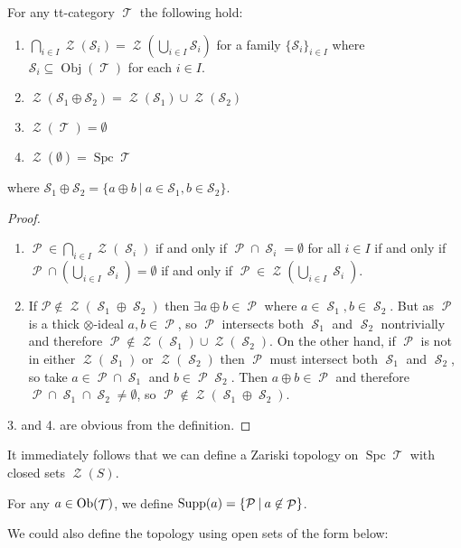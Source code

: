 \documentclass[11pt]{article}
\DeclareMathOperator{\CS}{\mathcal{S}}
\DeclareMathOperator{\cS}{\mathcal{S}}
\DeclareMathOperator{\cZ}{\mathcal{Z}}
\DeclareMathOperator{\ob}{Obj}
\DeclareMathOperator{\TT}{\mathcal{T}}
\DeclareMathOperator{\cP}{\mathcal{P}}
\DeclareMathOperator{\spc}{Spc}
\begin{document}
\begin{prop}
For any tt-category $\TT$ the following hold:
\begin{enumerate}[1.]
	\item $\bigcap_{i \in I}\cZ(\mathcal{S}_i) = \cZ(\bigcup_{i \in I}\mathcal{S}_i)$ for a family $\{\mathcal{S}_i\}_{i \in I}$ where $\mathcal{S}_i \subseteq \ob(\TT)$ for each $i \in I$.
	\item $\cZ(\mathcal{S}_1 \oplus \mathcal{S}_2) = \cZ(\mathcal{S}_1) \cup \cZ(\mathcal{S}_2)$ 
	\item $\cZ(\TT) = \emptyset$
	\item $\cZ(\emptyset) = \spc \TT$
\end{enumerate}
where $\mathcal{S}_1 \oplus \mathcal{S}_2 = \{a \oplus b\:|\: a \in \mathcal{S}_1, b \in \mathcal{S}_2\}$.
\end{prop}
\begin{proof}
\

\begin{enumerate}[1.]
	\item  $\cP \in \bigcap_{i \in I}\cZ(\cS_i)$ if and only if $\cP \cap \cS_i = \emptyset$ for all $i \in I$ if and only if $\cP \cap \left(\bigcup_{i \in I}\cS_i \right) = \emptyset $ if and only if $\cP \in \cZ(\bigcup_{i \in I}\cS_i)$.
	\item If $\mathcal{P} \not\in \cZ(\CS_1 \oplus \CS_2)$ then $\exists a \oplus b \in \cP$ where $a \in \CS_1,b \in \CS_2$. But as $\cP$ is a thick $\otimes$-ideal $a,b \in \cP$, so $\cP$ intersects both $\CS_1$ and $\CS_2$ nontrivially and therefore $\cP \not\in \cZ(\CS_1) \cup \cZ(\CS_2)$. On the other hand, if $\cP$ is not in either $\cZ(\CS_1)$ or $\cZ(\CS_2)$ then $\cP$ must intersect both $\CS_1$ and $\CS_2$, so take $a \in \cP \cap \CS_1$ and $b \in \cP \CS_2$. Then $a \oplus b \in \cP$ and therefore $\cP \cap \CS_1 \cap \CS_2 \not = \emptyset$, so $\cP \not\in \cZ(\CS_1 \oplus \CS_2)$.
\end{enumerate}
3. and 4. are obvious from the definition.
\end{proof}

It immediately follows that we can define a Zariski topology on $\spc \TT$ with closed sets $\cZ(S)$.

\begin{defn}
For any $a \in \Ob(\TT)$, we define $\Supp(a) = \{\mathcal{P}\:|\: a \not\in \cP\}$.
\end{defn}

We could also define the topology using open sets of the form below:
\end{document}
